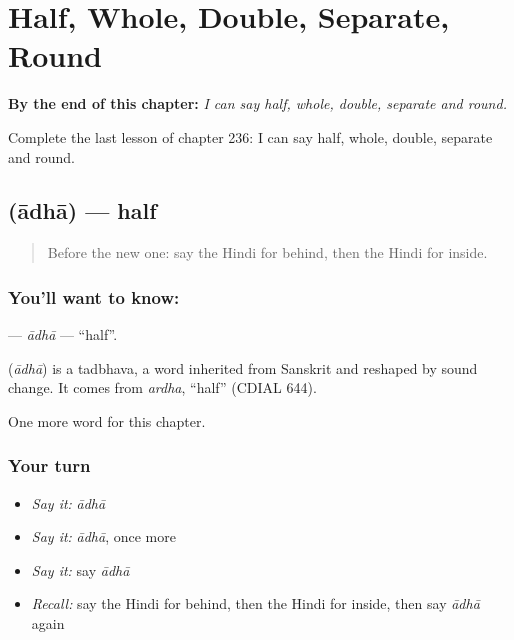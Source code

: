 
\chapter{Half, Whole, Double, Separate, Round}
\label{ch:hi-half-whole-double-separate-round}

\begin{chapteropening}
\textbf{By the end of this chapter:} \emph{I can say half, whole, double, separate and round.}

Complete the last lesson of chapter 236: I can say half, whole, double, separate and round.
\end{chapteropening}

\section[\texorpdfstring{\hi{आधा} (ādhā)}{आधा (ādhā)}]{ (ādhā) — half}

\label{lesson:HI-C236-adha}



\begin{quote}
Before the new one: say the Hindi for behind, then the Hindi for inside.
\end{quote}

\subsection*{You'll want to know: }
\textbf{} — \emph{ādhā} — \textquotedblleft{}half\textquotedblright{}.

\begin{cousinweb}
\textbf{} (\emph{ādhā}) is a tadbhava, a word inherited from Sanskrit and reshaped by sound change. It comes from \emph{ardha}, \textquotedblleft{}half\textquotedblright{} (CDIAL 644).
\end{cousinweb}

\begin{grammarlens}[title={What you've built}]
One more word for this chapter.
\end{grammarlens}

\subsection*{Your turn}
\begin{itemize}
\raggedright
  \item \emph{Say it:} \emph{ādhā}
  \item \emph{Say it:} \emph{ādhā}, once more
  \item \emph{Say it:} say \emph{ādhā}
  \item \emph{Recall:} say the Hindi for behind, then the Hindi for inside, then say \emph{ādhā} again
\end{itemize}

